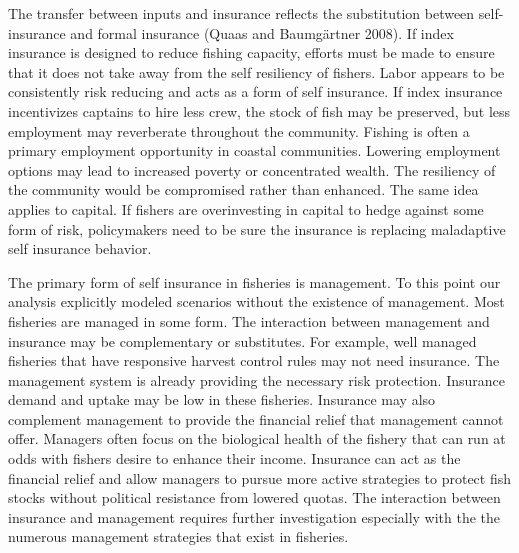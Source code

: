 \documentclass[
  letterpaper,
  DIV=11,
  numbers=noendperiod]{scrartcl}
\theoremstyle{plain}
\theoremstyle{plain}
\theoremstyle{remark}
\begin{document}
The transfer between inputs and insurance reflects the substitution
between self-insurance and formal insurance (Quaas and Baumgärtner
2008). If index insurance is designed to reduce fishing capacity,
efforts must be made to ensure that it does not take away from the self
resiliency of fishers. Labor appears to be consistently risk reducing
and acts as a form of self insurance. If index insurance incentivizes
captains to hire less crew, the stock of fish may be preserved, but less
employment may reverberate throughout the community. Fishing is often a
primary employment opportunity in coastal communities. Lowering
employment options may lead to increased poverty or concentrated wealth.
The resiliency of the community would be compromised rather than
enhanced. The same idea applies to capital. If fishers are overinvesting
in capital to hedge against some form of risk, policymakers need to be
sure the insurance is replacing maladaptive self insurance behavior.

The primary form of self insurance in fisheries is management. To this
point our analysis explicitly modeled scenarios without the existence of
management. Most fisheries are managed in some form. The interaction
between management and insurance may be complementary or substitutes.
For example, well managed fisheries that have responsive harvest control
rules may not need insurance. The management system is already providing
the necessary risk protection. Insurance demand and uptake may be low in
these fisheries. Insurance may also complement management to provide the
financial relief that management cannot offer. Managers often focus on
the biological health of the fishery that can run at odds with fishers
desire to enhance their income. Insurance can act as the financial
relief and allow managers to pursue more active strategies to protect
fish stocks without political resistance from lowered quotas. The
interaction between insurance and management requires further
investigation especially with the the numerous management strategies
that exist in fisheries.
\end{document}
